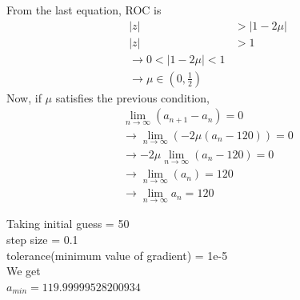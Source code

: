 \documentclass{beamer}
\providecommand{\brak}[1]{\ensuremath{\left(#1\right)}}
\theoremstyle{remark}
\providecommand{\abs}[1]{\left\vert#1\right\vert}
\numberwithin{equation}{section}
\begin{document}
\begin{frame}
From the last equation, ROC is 
\begin{align}
    \abs{z} &> \abs{1-2\mu}\\
    \abs{z} &> 1 \\
    \xrightarrow{} 0 < |1-2\mu| < 1\\
    \xrightarrow{} \mu \in \brak{0, \frac{1}{2}}
\end{align}
Now, if $\mu$ satisfies the previous condition,
\begin{align}
    \lim_{n \to \infty} \brak{a_{n+1} - a_n} = 0\\
    \xrightarrow{} \lim_{n \to \infty} \brak{- 2\mu\brak{a_n-120}} = 0\\
    \xrightarrow{} {-2\mu}\lim_{n \to \infty} \brak{a_n-120} = 0\\
    \xrightarrow{} \lim_{n \to \infty} \brak{a_n} = 120\\
    \xrightarrow{} \lim_{n \to \infty} a_n = 120
\end{align}
\end{frame}
\begin{frame}
Taking initial guess = 50\\ step size = 0.1\\ tolerance(minimum value of gradient) = 1e-5\\ We get \\
$a_{min} = 119.99999528200934$\\
\end{frame}
\end{document}
